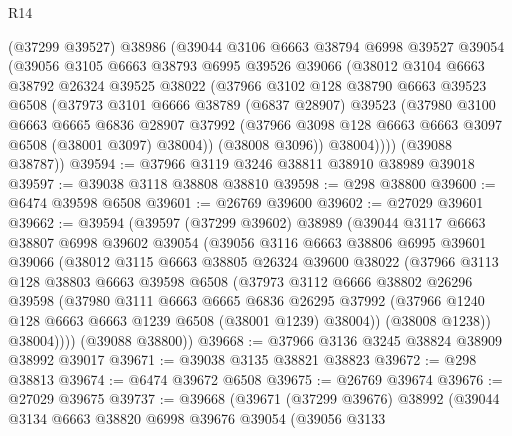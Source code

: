 \begin{lexlean}{R14}
\begin{coremodule}
      (@37299 @39527)
      @38986
      (@39044
        @3106
        @6663
        @38794
        @6998
        @39527
        @39054
        (@39056
          @3105
          @6663
          @38793
          @6995
          @39526
          @39066
          (@38012
            @3104
            @6663
            @38792
            @26324
            @39525
            @38022
            (@37966
              @3102
              @128
              @38790
              @6663
              @39523
              @6508
              (@37973
                @3101
                @6666
                @38789
                (@6837 @28907)
                @39523
                (@37980
                  @3100
                  @6663
                  @6665
                  @6836
                  @28907
                  @37992
                  (@37966 @3098 @128 @6663 @6663 @3097 @6508 (@38001 @3097) @38004))
                (@38008 @3096))
              @38004))))
      (@39088 @38787))
@39594 := @37966 @3119 @3246 @38811 @38910 @38989 @39018
@39597 := @39038 @3118 @38808 @38810
@39598 := @298 @38800
@39600 := @6474 @39598 @6508
@39601 := @26769 @39600
@39602 := @27029 @39601
@39662 := @39594
    (@39597
      (@37299 @39602)
      @38989
      (@39044
        @3117
        @6663
        @38807
        @6998
        @39602
        @39054
        (@39056
          @3116
          @6663
          @38806
          @6995
          @39601
          @39066
          (@38012
            @3115
            @6663
            @38805
            @26324
            @39600
            @38022
            (@37966
              @3113
              @128
              @38803
              @6663
              @39598
              @6508
              (@37973
                @3112
                @6666
                @38802
                @26296
                @39598
                (@37980
                  @3111
                  @6663
                  @6665
                  @6836
                  @26295
                  @37992
                  (@37966 @1240 @128 @6663 @6663 @1239 @6508 (@38001 @1239) @38004))
                (@38008 @1238))
              @38004))))
      (@39088 @38800))
@39668 := @37966 @3136 @3245 @38824 @38909 @38992 @39017
@39671 := @39038 @3135 @38821 @38823
@39672 := @298 @38813
@39674 := @6474 @39672 @6508
@39675 := @26769 @39674
@39676 := @27029 @39675
@39737 := @39668
    (@39671
      (@37299 @39676)
      @38992
      (@39044
        @3134
        @6663
        @38820
        @6998
        @39676
        @39054
        (@39056
          @3133

\end{coremodule}
\end{lexlean}
